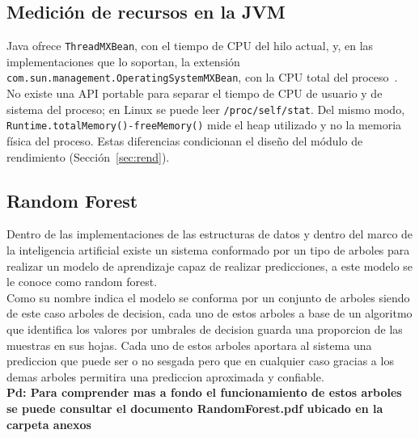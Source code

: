 \subsection{Medición de recursos en la JVM}
Java ofrece \texttt{ThreadMXBean}, con el tiempo de CPU del hilo actual, y, en las implementaciones que lo soportan, la extensión \texttt{com.sun.management.OperatingSystemMXBean}, con la CPU total del proceso~\cite{oraclejmx}. No existe una API portable para separar el tiempo de CPU de usuario y de sistema del proceso; en Linux se puede leer \texttt{/proc/self/stat}. Del mismo modo, \texttt{Runtime.totalMemory()-freeMemory()} mide el heap utilizado y no la memoria física del proceso. Estas diferencias condicionan el diseño del módulo de rendimiento (Sección~\ref{sec:rend}).

\subsection{Random Forest}
Dentro de las implementaciones de las estructuras de datos y dentro del marco de la inteligencia artificial existe un sistema conformado por un tipo de arboles para realizar un modelo de aprendizaje capaz de realizar predicciones, a este modelo se le conoce como random forest.
\\
Como su nombre indica el modelo se conforma por un conjunto de arboles siendo de este caso arboles de decision, cada uno de estos arboles a base de un algoritmo que identifica los valores por umbrales de decision guarda una proporcion de las muestras en sus hojas. Cada uno de estos arboles aportara al sistema una prediccion que puede ser o no sesgada pero que en cualquier caso gracias a los demas arboles permitira una prediccion aproximada y confiable. \cite{RF}
\\
\textbf{Pd: Para comprender mas a fondo el funcionamiento de estos arboles se puede consultar el documento RandomForest.pdf ubicado en la carpeta anexos}